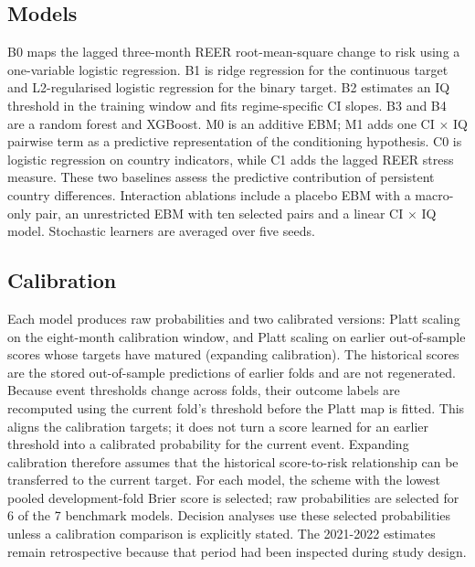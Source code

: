 \documentclass[preprint,12pt,authoryear]{elsarticle}
\begin{document}
\subsection{Models}
B0 maps the lagged three-month REER root-mean-square change to risk using a one-variable logistic regression. B1 is ridge regression for the continuous target and L2-regularised logistic regression for the binary target. B2 estimates an IQ threshold in the training window and fits regime-specific CI slopes. B3 and B4 are a random forest and XGBoost. M0 is an additive EBM; M1 adds one CI $\times$ IQ pairwise term as a predictive representation of the conditioning hypothesis. C0 is logistic regression on country indicators, while C1 adds the lagged REER stress measure. These two baselines assess the predictive contribution of persistent country differences. Interaction ablations include a placebo EBM with a macro-only pair, an unrestricted EBM with ten selected pairs and a linear CI $\times$ IQ model. Stochastic learners are averaged over five seeds.

\subsection{Calibration}
Each model produces raw probabilities and two calibrated versions: Platt scaling on the eight-month calibration window, and Platt scaling on earlier out-of-sample scores whose targets have matured (expanding calibration). The historical scores are the stored out-of-sample predictions of earlier folds and are not regenerated. Because event thresholds change across folds, their outcome labels are recomputed using the current fold's threshold before the Platt map is fitted. This aligns the calibration targets; it does not turn a score learned for an earlier threshold into a calibrated probability for the current event. Expanding calibration therefore assumes that the historical score-to-risk relationship can be transferred to the current target. For each model, the scheme with the lowest pooled development-fold Brier score is selected; raw probabilities are selected for 6 of the 7 benchmark models. Decision analyses use these selected probabilities unless a calibration comparison is explicitly stated. The 2021-2022 estimates remain retrospective because that period had been inspected during study design.
\end{document}

